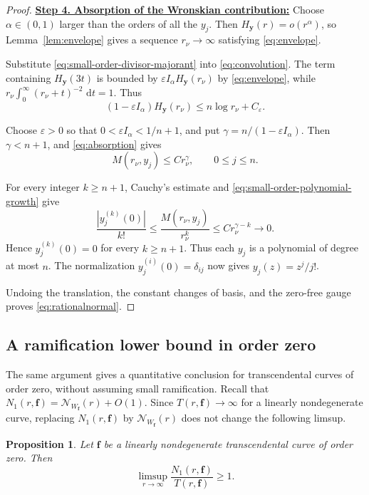 \documentclass[12pt,letterpaper,reqno]{amsart}
\newtheorem{prop}[thm]{Proposition}
\theoremstyle{definition}
\numberwithin{equation}{section}
\newcommand{\dd}{\,\mathrm d}
\newcommand{\NN}{\mathcal N}
\newcommand{\fv}{\bm f}
\newcommand{\yv}{\bm y}
\begin{document}
\begin{proof}
\medskip\noindent
\textbf{\underline{Step 4. Absorption of the Wronskian contribution:}}
Choose \(\alpha\in(0,1)\) larger than the orders of all the \(y_j\).
Then \(H_{\yv}(r)=o(r^\alpha)\), so
Lemma~\ref{lem:envelope} gives a sequence \(r_\nu\to\infty\)
satisfying \eqref{eq:envelope}.

Substitute \eqref{eq:small-order-divisor-majorant} into
\eqref{eq:convolution}. The term containing \(H_{\yv}(3t)\) is
bounded by \(\varepsilon I_\alpha H_{\yv}(r_\nu)\) by
\eqref{eq:envelope}, while
\(r_\nu\int_0^\infty(r_\nu+t)^{-2}\,\dd t=1\).
Thus
\begin{equation}\label{eq:absorption}
 (1-\varepsilon I_\alpha)H_{\yv}(r_\nu)
 \leq
 n\log r_\nu+C_\varepsilon.
\end{equation}

Choose \(\varepsilon>0\) so that
\(0<\varepsilon I_\alpha<1/{n+1}\), and put
\(\gamma=n/(1-\varepsilon I_\alpha)\). Then \(\gamma<{n+1}\), and
\eqref{eq:absorption} gives
\begin{equation}\label{eq:small-order-polynomial-growth}
 M(r_\nu,y_j)
 \leq
 C r_\nu^\gamma,
 \qquad
 0\leq j\leq n.
\end{equation}

For every integer \(k\geq n+1\), Cauchy's estimate and
\eqref{eq:small-order-polynomial-growth} give
\[
 \frac{|y_j^{(k)}(0)|}{k!}
 \leq
 \frac{M(r_\nu,y_j)}{r_\nu^k}
 \leq
 C r_\nu^{\gamma-k}
 \longrightarrow0.
\]
Hence \(y_j^{(k)}(0)=0\) for every \(k\geq n+1\). Thus each \(y_j\) is
a polynomial of degree at most \(n\). The normalization
\(y_j^{(i)}(0)=\delta_{ij}\) now gives
\(y_j(z)=z^j/j!\).

Undoing the translation, the constant changes of basis, and the
zero-free gauge proves \eqref{eq:rationalnormal}.
\end{proof}


\subsection{A ramification lower bound in order zero}

The same argument gives a quantitative conclusion for transcendental
curves of order zero, without assuming small ramification. Recall that
\(N_1(r,\fv)=\NN_{W_{\fv}}(r)+O(1)\). Since
\(T(r,\fv)\to\infty\) for a linearly nondegenerate curve, replacing
\(N_1(r,\fv)\) by \(\NN_{W_{\fv}}(r)\) does not change the following
limsup.

\begin{prop}\label{prop:zero-order-ramification}
Let \(\fv\) be a linearly nondegenerate transcendental curve of order
zero. Then
\begin{equation}\label{eq:zero-order-ramification}
 \limsup_{r\to\infty}
 \frac{N_1(r,\fv)}{T(r,\fv)}
 \geq1.
\end{equation}
\end{prop}
\end{document}
